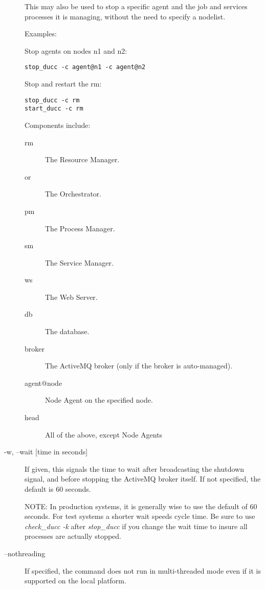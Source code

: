 \begin{description}
            This may also be used to stop a specific agent and the job and services processes it is
            managing, without the need to specify a nodelist.  
            
            Examples: 

            Stop agents on nodes n1 and n2:
\begin{verbatim}
stop_ducc -c agent@n1 -c agent@n2 
\end{verbatim}
            
            Stop and restart the rm: 
\begin{verbatim}
stop_ducc -c rm 
start_ducc -c rm
\end{verbatim}
            
            Components include: 
            \begin{description}
              \item[rm] The Resource Manager.                 
              \item[or] The Orchestrator.                 
              \item[pm] The Process Manager.                 
              \item[sm] The Service Manager.                 
              \item[ws] The Web Server.                 
              \item[db] The database.
              \item[broker] The ActiveMQ broker (only if the broker is auto-managed).
              \item[agent@node] Node Agent on the specified node.
              \item[head] All of the above, except Node Agents
              \end{description}

          \item[-w, --wait {[time in seconds]}] If given, this signals the time to wait
            after broadcasting the shutdown signal, and before stopping the ActiveMQ broker itself.
            If not specified, the default is 60 seconds.  

            NOTE: In production systems, it is generally wise to use the default of 60 seconds.  For
            test systems a shorter wait speeds cycle time.  Be sure to use {\em check\_ducc -k} after
            {\em stop\_ducc} if you change the wait time to insure all processes are actually stopped.

          \item[--nothreading] If specified, the command does not run in multi-threaded mode
            even if it is supported on the local platform.
              
       \end{description}
            
